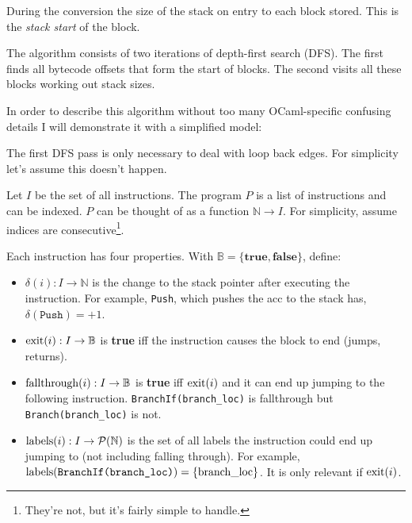 During the conversion the size of the stack on entry to each block stored. This is the \emph{stack
      start} of the block.


The algorithm consists of two iterations of depth-first search (DFS). The first finds all bytecode
offsets that form the start of blocks. The second visits all these blocks working out stack sizes.

In order to describe this algorithm without too many OCaml-specific confusing details I will
demonstrate it with
a simplified model:

The first DFS pass is only necessary to deal with loop back edges. For simplicity let's assume this
doesn't happen.

Let \(I\) be the set of all instructions. The program \(P\) is a list of instructions and can be
indexed. \(P\) can be thought of as a function \(\mathbb{N} \to I\).
For simplicity, assume indices are consecutive\footnote{They're not, but it's fairly simple to
      handle.}.

Each instruction has four properties. With $\mathbb{B} = \{ \textbf{true}, \textbf{false} \}$,
define:

\begin{itemize}
      \item \(\delta(i) : I \to \mathbb{N} \) is the change to the stack pointer after executing
            the
            instruction. For
            example, \texttt{Push}, which pushes the acc to the stack has, \(\delta(\texttt{Push})
            =
            +1\).
      \item \(\operatorname{exit}(i) : I \to \mathbb{B} \) is \textbf{true} iff the instruction causes
            the block to end
            (jumps, returns).
      \item \(\operatorname{fallthrough}(i) : I \to \mathbb{B} \) is \textbf{true} iff \(\operatorname{exit}(i)\)
            and it can end up
            jumping to the following instruction. \texttt{BranchIf(branch\_loc)} is fallthrough but
            \texttt{Branch(branch\_loc)} is not.
      \item \(\operatorname{labels}(i) : I \to \mathcal{P}(\mathbb{N}) \) is the set of all labels the
            instruction could end up jumping to
            (not
            including falling through). For example, \(\operatorname{labels}(\texttt{BranchIf(branch\_loc)}) =
            \{\text{branch\_loc}\}\). It is only relevant if \(\operatorname{exit}(i)\).
\end{itemize}

